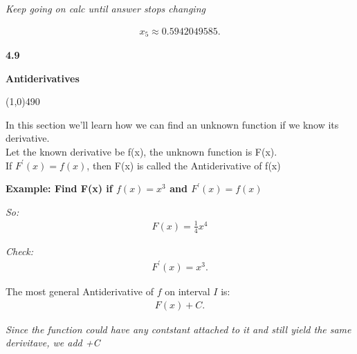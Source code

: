 \documentclass{report}
\begin{document}
  \bigbreak \noindent 
  \textit{Keep going on calc until answer stops changing}

  \begin{align*}
    x_5 \approx 0.5942049585
  .\end{align*}

  \pagebreak \bigbreak \noindent
  \begin{Large}
      \begin{mdframed}
          \begin{center}
              \textbf{4.9}
          \end{center}
      \end{mdframed}
  \end{Large}
  \begin{Large}
      \begin{center}
          \textbf{Antiderivatives}
      \end{center}
  \end{Large}
  \line(1,0){490}
  

  \bigbreak \noindent \bigbreak \noindent \bigbreak \noindent 
  In this section we'll learn how we can find an unknown function if we know its derivative.  \\
  Let the known derivative be f(x), the unknown function is F(x). \\
  If $F^{\prime}(x)= f(x)$, then F(x) is called the Antiderivative of f(x)

  \bigbreak \noindent 
  \begin{mdframed}
    \textbf{Example: Find F(x) if $f(x) = x^{3} $ and $F^{\prime}(x) =f(x)$}
  \end{mdframed}

  \bigbreak \noindent
  \textit{So:}
  \begin{align*}
    F(x) = \frac{1}{4}x^{4}
  \end{align*}

  \bigbreak \noindent 
  \textit{Check:}
  \begin{align*}
    F^{\prime}(x) = x^{3}
  .\end{align*}

  \bigbreak \noindent \bigbreak \noindent 
  The most general Antiderivative of $f$ on interval $I$ is:
  \begin{align*}
    F(x) + C 
  .\end{align*}

  \bigbreak \noindent \bigbreak \noindent 
  \textit{Since the function could have any contstant attached to it and still yield the same derivitave, we add +C}
\end{document}
